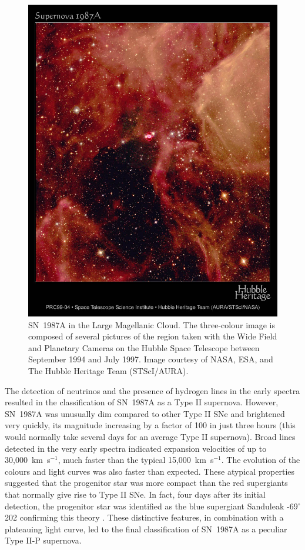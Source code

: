 \begin{figure}
\centering
\includegraphics[clip=true,scale=0.6,trim= 20 80 20 40]{chapters/chapter5/images/87A_image.jpg}
\caption{SN~1987A in the Large Magellanic Cloud.  The three-colour image is composed of several pictures of the region taken with the Wide Field and Planetary Cameras on the Hubble Space Telescope between September 1994 and July 1997.  Image courtesy of NASA, ESA, and The Hubble Heritage Team (STScI/AURA).}
\label{87A_img}
\end{figure}

The detection of neutrinos and the presence of hydrogen lines in the early spectra resulted in the classification of SN~1987A as a Type II supernova.  However, SN~1987A was unusually dim compared to other Type II SNe and brightened very quickly, its magnitude increasing by a factor of 100 in just three hours (this would normally take several days for an average Type II supernova).  Broad lines detected in the very early spectra indicated expansion velocities of up to 30,000~km~s$^{-1}$, much faster than the typical 15,000~km~s$^{-1}$.  The evolution of the colours and light curves was also faster than  expected.  These atypical properties suggested that the progenitor star was more compact than the red supergiants that normally give rise to Type II SNe.  In fact, four days after its initial detection, the progenitor star was identified as the blue supergiant Sanduleak -69$^{\circ}$ 202  confirming this theory \citep{Sonneborn1987}.  These distinctive features, in combination with a plateauing light curve, led to the final classification of SN~1987A as a peculiar Type II-P supernova. 

